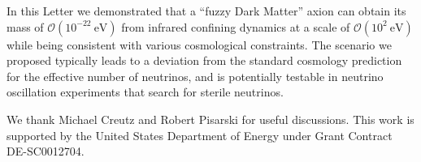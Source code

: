 \documentclass[twocolumn,preprintnumbers,
endnote,prl]{revtex4-1}
\newcommand{\ord}[1]{\mathcal{O}{(#1)}}
\begin{document}
In this Letter we demonstrated that a ``fuzzy Dark Matter'' axion can obtain its mass of $\ord{10^{-22}~\text{eV}}$ from infrared confining dynamics at a scale of $\ord{10^2~\text{eV}}$ while being consistent with various cosmological constraints. The scenario we proposed typically leads to a deviation from the standard cosmology 
prediction for the effective number of neutrinos, and is potentially testable 
in neutrino oscillation experiments that search for sterile neutrinos.          

  

\acknowledgments
We thank Michael Creutz and Robert Pisarski for useful discussions.
This work is supported by the United States Department of Energy under Grant Contract DE-SC0012704.

%
%

%


\end{document}
